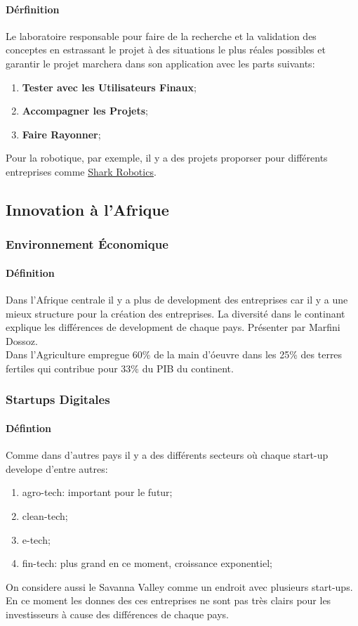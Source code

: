 \documentclass{article}
\begin{document}
\paragraph{Dérfinition}Le laboratoire responsable pour faire de la recherche et la validation des conceptes en estrassant le projet à des situations le plus réales possibles et garantir le projet marchera dans son application avec les parts suivants:
\begin{enumerate}[noitemsep]
    \item \textbf{Tester avec les Utilisateurs Finaux};
    \item \textbf{Accompagner les Projets};
    \item \textbf{Faire Rayonner};
\end{enumerate}
Pour la robotique, par exemple, il y a des projets proporser pour différents entreprises comme \href{https://www.shark-robotics.com/}{Shark Robotics}.


\newpage\subsection{Innovation à l'Afrique}
\subsubsection{Environnement Économique}
\paragraph{Définition}Dans l'Afrique centrale il y a plus de development des entreprises car il y a une mieux structure pour la création des entreprises. La diversité dans le continant explique les différences de development de chaque pays. Présenter par Marfini Dossoz.\\

\noindent Dans l'Agriculture empregue 60\% de la main d'óeuvre dans les 25\% des terres fertiles qui contribue pour 33\% du PIB du continent.

\subsubsection{Startups Digitales}
\paragraph{Défintion}Comme dans d'autres pays il y a des différents secteurs où chaque start-up develope d'entre autres:
\begin{enumerate}[noitemsep]
    \item agro-tech: important pour le futur;
    \item clean-tech;
    \item e-tech;
    \item fin-tech: plus grand en ce moment, croissance exponentiel;
\end{enumerate}
\noindent On considere aussi le Savanna Valley comme un endroit avec plusieurs start-ups. En ce moment les donnes des ces entreprises ne sont pas très clairs pour les investisseurs à cause des différences de chaque pays.\\
\end{document}
